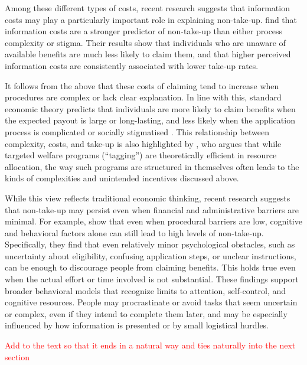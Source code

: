 Among these different types of costs, recent research suggests that information costs may play a particularly important role in explaining non-take-up. \cite{bolland_information_nodate} find that information costs are a stronger predictor of non-take-up than either process complexity or stigma. Their results show that individuals who are unaware of available benefits are much less likely to claim them, and that higher perceived information costs are consistently associated with lower take-up rates. 

It follows from the above that these costs of claiming tend to increase when procedures are complex or lack clear explanation. In line with this, standard economic theory predicts that individuals are more likely to claim benefits when the expected payout is large or long-lasting, and less likely when the application process is complicated or socially stigmatised \citep{janssens_totake_2022, booij_role_2012}. This relationship between complexity, costs, and take-up is also highlighted by \cite{akerlof_tagging_1978}, who argues that while targeted welfare programs (“tagging”) are theoretically efficient in resource allocation, the way such programs are structured in themselves often leads to the kinds of complexities and unintended incentives discussed above.

While this view reflects traditional economic thinking, recent research suggests that non-take-up may persist even when financial and administrative barriers are minimal. For example, \cite{bhargava_psychological_2015} show that even when procedural barriers are low, cognitive and behavioral factors alone can still lead to high levels of non-take-up. Specifically, they find that even relatively minor psychological obstacles, such as uncertainty about eligibility, confusing application steps, or unclear instructions, can be enough to discourage people from claiming benefits. This holds true even when the actual effort or time involved is not substantial. These findings support broader behavioral models that recognize limits to attention, self-control, and cognitive resources. People may procrastinate or avoid tasks that seem uncertain or complex, even if they intend to complete them later, and may be especially influenced by how information is presented or by small logistical hurdles.

\textcolor{red}{Add to the text so that it ends in a natural way and ties naturally into the next section}

